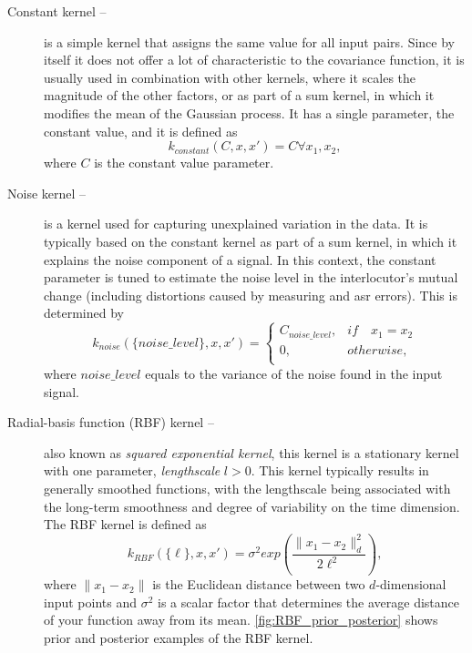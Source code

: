 \begin{description}
	\item[Constant kernel -- ]
	is a simple kernel that assigns the same value for all input pairs.
	Since by itself it does not offer a lot of characteristic to the covariance function, it is usually used in combination with other kernels, where it scales the magnitude of the other factors, or as part of a sum kernel, in which it modifies the mean of the Gaussian process.
	It has a single parameter, the constant value, and it is defined as 
	\begin{equation}
		\label{eq:constant_kernel}
		k_{constant}(C, x, x') = C\forall x_1, x_2,
	\end{equation}
	where $C$ is the constant value parameter.
	
	\item[Noise kernel -- ]
	is a kernel used for capturing unexplained variation in the data.
	It is typically based on the constant kernel as part of a sum kernel, in which it explains the noise component of a signal.
	In this context, the constant parameter is tuned to estimate the noise level in the interlocutor's mutual change (including distortions caused by measuring and \ac{asr} errors).
	This is determined by
	\begin{equation}
		\label{eq:noise_kernel}
		k_{noise}(\{noise\_level\}, x, x') =
		\begin{cases}
		C_{noise\_level}, & if\quad x_1 = x_2\\
		0, & otherwise,\\
		\end{cases}
	\end{equation}
	where $noise\_level$ equals to the variance of the noise found in the input signal.
	
	\item[Radial-basis function (RBF) kernel --]
	also known as \emph{squared exponential kernel}, this kernel is a stationary kernel with one parameter, \emph{lengthscale} $l > 0$.
	This kernel typically results in generally smoothed functions, with the lengthscale being associated with the long-term smoothness and degree of variability on the time dimension.
	The RBF kernel is defined as
	\begin{equation}
		\label{eq:RBF_kernel}
		k_{RBF}(\{\ell\}, x, x') = \sigma^2 exp\left(\frac{\lVert x_1 - x_2 \lVert ^2_d}{2\ell^2}\right),
	\end{equation}
	where $\lVert x_1 - x_2 \lVert$ is the Euclidean distance between two $d$-dimensional input points and $\sigma^2$ is a scalar factor that determines the average distance of your function away from its mean.
	\cref{fig:RBF_prior_posterior} shows prior and posterior examples of the RBF kernel.
	

\end{description}
